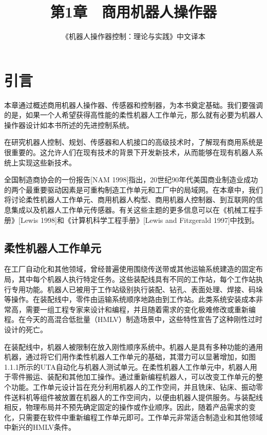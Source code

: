 \documentclass[UTF8,a4paper]{ctexart}
\title{第1章　商用机器人操作器}
\author{《机器人操作器控制：理论与实践》中文译本}
\date{}
\begin{document}
\maketitle

\section{引言}

本章通过概述商用机器人操作器、传感器和控制器，为本书奠定基础。我们要强调的是，如果一个人希望获得高性能的柔性机器人工作单元，那么就有必要为机器人操作器设计如本书所述的先进控制系统。

在研究机器人控制、规划、传感器和人机接口的高级技术时，了解现有商用系统是很重要的。这允许人们在现有技术的背景下开发新技术，从而能够在现有机器人系统上实现这些新技术。

全国制造商协会的一份报告[NAM 1998]指出，20世纪90年代美国商业制造业成功的两个最重要驱动因素是可重构制造工作单元和工厂中的局域网。在本章中，我们将讨论柔性机器人工作单元、商用机器人构型、商用机器人控制器、到互联网的信息集成以及机器人工作单元传感器。有关这些主题的更多信息可以在《机械工程手册》[Lewis 1998]和《计算机科学工程手册》[Lewis and Fitzgerald 1997]中找到。

\subsection{柔性机器人工作单元}

在工厂自动化和其他领域，曾经普遍使用围绕传送带或其他运输系统建造的固定布局，其中每个机器人执行特定任务。这些装配线具有不同的工作站，每个工作站执行专用功能。机器人已被用于工作站级别执行装配、钻孔、表面处理、焊接、码垛等操作。在装配线中，零件由运输系统顺序地路由到工作站。此类系统安装成本非常高，需要一组工程专家来设计和编程，并且随着需求的变化极难修改或重新编程。在今天的高混合低批量（HMLV）制造场景中，这些特性宣告了这种刚性过时设计的死亡。

在装配线中，机器人被限制在放入刚性顺序系统中。机器人是具有多种功能的通用机器，通过将它们用作柔性机器人工作单元的基础，其潜力可以显著增加，如图1.1.1所示的UTA自动化与机器人测试单元。在柔性机器人工作单元中，机器人用于零件搬运、装配和其他加工操作。通过重新编程机器人，可以改变工作单元的整个功能。工作单元设计旨在充分利用机器人的工作空间，并且铣床、钻床、振动零件送料机等组件被放置在机器人的工作空间内，以便由机器人提供服务。与装配线相反，物理布局并不预先确定固定的操作或作业顺序。因此，随着产品需求的变化，只需要在软件中重新编程工作单元即可。工作单元非常适合制造业和其他领域中新兴的HMLV条件。
\end{document}
